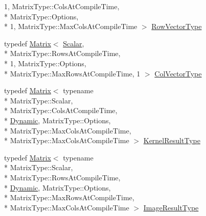\begin{DoxyCompactItemize}
1, Matrix\-Type\-::\-Cols\-At\-Compile\-Time, \\*
Matrix\-Type\-::\-Options, \\*
1, Matrix\-Type\-::\-Max\-Cols\-At\-Compile\-Time $>$ \hyperlink{class_l_u_acc26e46398241948a442c0435c282fd1}{Row\-Vector\-Type}
\item 
typedef \hyperlink{class_matrix}{Matrix}$<$ \hyperlink{class_l_u_a2652e625ba82c85391e6cf4c3d821350}{Scalar}, \\*
Matrix\-Type\-::\-Rows\-At\-Compile\-Time, \\*
1, Matrix\-Type\-::\-Options, \\*
Matrix\-Type\-::\-Max\-Rows\-At\-Compile\-Time, 1 $>$ \hyperlink{class_l_u_affc6f0ec6472f4868698a066be969111}{Col\-Vector\-Type}
\item 
typedef \hyperlink{class_matrix}{Matrix}$<$ typename \\*
Matrix\-Type\-::\-Scalar, \\*
Matrix\-Type\-::\-Cols\-At\-Compile\-Time, \\*
\hyperlink{_constants_8h_adc9da5be31bdce40c25a92c27999c0e3}{Dynamic}, Matrix\-Type\-::\-Options, \\*
Matrix\-Type\-::\-Max\-Cols\-At\-Compile\-Time, \\*
Matrix\-Type\-::\-Max\-Cols\-At\-Compile\-Time $>$ \hyperlink{class_l_u_a54c6b7bc8df14bc6d50249256a996e6f}{Kernel\-Result\-Type}
\item 
typedef \hyperlink{class_matrix}{Matrix}$<$ typename \\*
Matrix\-Type\-::\-Scalar, \\*
Matrix\-Type\-::\-Rows\-At\-Compile\-Time, \\*
\hyperlink{_constants_8h_adc9da5be31bdce40c25a92c27999c0e3}{Dynamic}, Matrix\-Type\-::\-Options, \\*
Matrix\-Type\-::\-Max\-Rows\-At\-Compile\-Time, \\*
Matrix\-Type\-::\-Max\-Cols\-At\-Compile\-Time $>$ \hyperlink{class_l_u_a0c18d8a15aeec09772ef473875c03b2b}{Image\-Result\-Type}
\end{DoxyCompactItemize}
